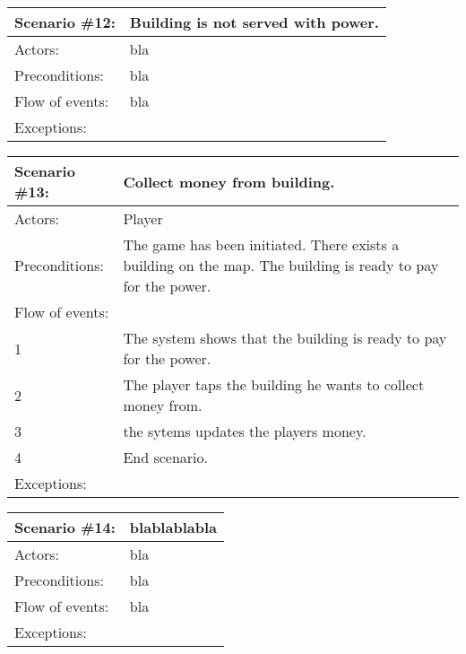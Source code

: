 \begin{tabular}{| l | p{10cm} |}
	\hline
	{\bf Scenario \#12:} & {\bf Building is not served with power.} \\ \hline
	Actors: & bla \\ \hline
	Preconditions: & bla \\ \hline
	Flow of events: & bla \\ \hline
	Exceptions: \\ \hline
\end{tabular}

\begin{tabular}{| l | p{10cm} |}
	\hline
	{\bf Scenario \#13:} & {\bf Collect money from building.} \\ \hline
	Actors: & Player \\ \hline
	Preconditions: & The game has been initiated. There exists a building on the map. The building is ready to pay for the power. \\ \hline
	Flow of events: & \\ \hline
	1 & The system shows that the building is ready to pay for the power. \\ \hline
	2 & The player taps the building he wants to collect money from. \\ \hline
	3 & the sytems updates the players money. \\ \hline
	4 & End scenario. \\ \hline
	Exceptions: \\ \hline
\end{tabular}

\begin{tabular}{| l | p{10cm} |}
	\hline
	{\bf Scenario \#14:} & {\bf blablablabla} \\ \hline
	Actors: & bla \\ \hline
	Preconditions: & bla \\ \hline
	Flow of events: & bla \\ \hline
	Exceptions: \\ \hline
\end{tabular}